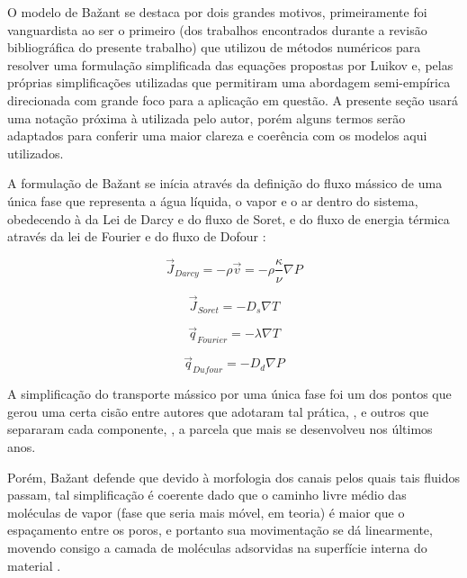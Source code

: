 O modelo de Ba\v{z}ant se destaca por dois grandes motivos, primeiramente foi
vanguardista ao ser o primeiro (dos trabalhos encontrados durante a revisão
bibliográfica do presente trabalho) que utilizou de métodos numéricos para
resolver uma formulação simplificada das equações propostas por Luikov e, pelas
próprias simplificações utilizadas que permitiram uma abordagem semi-empírica
direcionada com grande foco para a aplicação em questão. A presente seção usará
uma notação próxima à utilizada pelo autor, porém alguns termos serão adaptados
para conferir uma maior clareza e coerência com os modelos aqui utilizados.

A formulação de Ba\v{z}ant se inícia através da definição do fluxo mássico de
uma única fase que representa a água líquida, o vapor e o ar dentro do sistema,
obedecendo à da Lei de Darcy e do fluxo de Soret, e do fluxo de energia térmica
através da lei de Fourier e do fluxo de Dofour \cite{bazant1978thermal,
  bazant1978, bavzant1982, bazant1979}:

\begin{equation}
  \label{eq:Darcy}
  \vec{J}_{Darcy} = - \rho \vec{v} = - \rho \frac{\kappa }{\nu} \nabla P 
\end{equation}

\begin{equation}
  \label{eq:Soret}
  \vec{J}_{Soret} = - D_s \nabla T
\end{equation}

\begin{equation}
  \label{eq:Fourier}
  \vec{q}_{Fourier} = - \lambda \nabla T 
\end{equation}

\begin{equation}
  \label{eq:Dufour}
  \vec{q}_{Dufour} = - D_d \nabla P
\end{equation}

A simplificação do transporte mássico por uma única fase foi um dos pontos que
gerou uma certa cisão entre autores que adotaram tal prática, \cite{Gong1995a,
  Gong1991, Abdel-Rahman1996}, e outros que separaram cada componente,
\cite{Pesavento2013, Gawin2003, Gawin2004, Gawin1999, Fey2016b, Davie2006a,
  Davie2012a}, a parcela que mais se desenvolveu nos últimos anos.

Porém, Ba\v{z}ant defende que devido à morfologia dos canais pelos quais tais
fluidos passam, tal simplificação é coerente dado que o caminho livre médio das
moléculas de vapor (fase que seria mais móvel, em teoria) é maior que o
espaçamento entre os poros, e portanto sua movimentação se dá linearmente,
movendo consigo a camada de moléculas adsorvidas na superfície interna do
material \cite{bavzant2018creep}.

